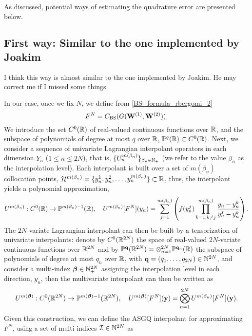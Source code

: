 As discussed, potential ways of estimating the quadrature error are presented below.
\subsection{First way: Similar to the one implemented by Joakim}
I think this way is almost similar to the one implemented by Joakim. He may correct me if I missed some things.

In our case, once we fix $N$, we define from \eqref{BS_formula_rbergomi_2}
\begin{equation*}
F^N=C_{\text{BS}}(G(\mathbf{W}^{(1)},\mathbf{W}^{(2)})) .
\end{equation*}
We introduce the set $C^0(\mathbb{R})$ of real-valued continuous functions over $\mathbb{R}$, and the subspace of polynomials of degree at most $q$ over $\mathbb{R}$, $\mathbb{P}^q(\mathbb{R}) \subset C^0(\mathbb{R})$. Next,
we consider a sequence of univariate Lagrangian interpolant operators in each dimension $Y_n$ ($1 \le n \le 2N$), that is, $\{U_n^{m(\beta_n)}\}_{\beta_n \in \mathbb{N}_+}$ (we refer to the value $\beta_n$ as the interpolation level). Each interpolant is built over a set of $m(\beta_n)$ collocation points, $\mathcal{H}^{m(\beta_n)}=\{y^1_n,y^2_n,\dots,y^{m(\beta_n)}_n\} \subset \mathbb{R}$, thus, the interpolant yields a polynomial approximation,
\begin{equation*}
U^{m(\beta_n)}:C^0(\mathbb{R}) \rightarrow \mathbb{P}^{m(\beta_n)-1}(\mathbb{R}), \quad U^{m(\beta_n)}[F^N](y_n)= \sum_{j=1}^{m(\beta_n)} \left( f(y^j_n) \prod_{k=1;k \neq j}^{m(\beta_n)} \frac{y_n-y_n^k}{y_n^j-y_n^k}\right) .
\end{equation*}
The $2N$-variate Lagrangian interpolant can then be built by a tensorization of univariate interpolants: denote by $C^0(\mathbb{R}^{2N})$ the space of real-valued $2N$-variate continuous functions over $\mathbb{R}^{2N}$ and by $\mathbb{P}^{\mathbf{q}}(\mathbb{R}^{2N}) = \otimes_{n=1}^{2N} \mathbb{P}^{\mathbf{q}_n}(\mathbb{R})$ the subspace of polynomials of degree at most $q_n$ over $\mathbb{R}$, with $\mathbf{q}=(q_1,\dots,q_{2N})\in  \mathbb{N}^{2N}$, and consider a multi-index $\boldsymbol{\beta} \in \mathbb{N}^{2N}_+$ assigning the interpolation level in each direction, $y_n$, then  the multivariate interpolant can then be written as
$$U^{m(\boldsymbol{\beta})}: C^0(\mathbb{R}^{2N}) \rightarrow \mathbb{P}^{m(\boldsymbol{\beta})-1}(\mathbb{R}^{2N}) ,\quad  U^{m(\boldsymbol{\beta})}[F^N](\mathbf{y})= \bigotimes_{n = 1}^{2N} U^{m(\beta_n)} [F^N](\mathbf{y}) . $$
Given this construction, we can define the ASGQ interpolant  for approximating $F^N$, using a set of multi indices $\mathcal{I} \in \mathbb{N}^{2N}$ as
